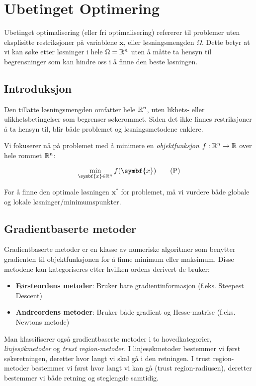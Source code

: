 \part{Ubetinget Optimering}
\label{part:unconstrained_optimization}

Ubetinget optimalisering (eller fri optimalisering) refererer til problemer uten eksplisitte restriksjoner på variablene \(\symbf{x}\), eller løsningsmengden \(\Omega\).
Dette betyr at vi kan søke etter løsninger i hele \(\Omega = \mathbb{R}^n\) uten å måtte ta hensyn til begrensninger som kan hindre oss i å finne den beste løsningen.

\chapter*{Introduksjon}
Den tillatte løsningsmengden omfatter hele \(\mathbb{R}^n\), uten likhets- eller ulikhetsbetingelser som begrenser søkerommet.
Siden det ikke finnes restriksjoner å ta hensyn til, blir både problemet og løsningsmetodene enklere.

Vi fokuserer nå på problemet med å minimere en \textit{objektfunksjon} \( f : \mathbb{R}^n \to \mathbb{R} \) over hele rommet \(\mathbb{R}^n\):

\[
	\min_{\symbf{x} \in \R^n} f(\symbf{x}) \tag{P} \label{eq:global_minimization_problem}
\]

For å finne den optimale løsningen \(\symbf{x}^\ast\) for problemet, må vi vurdere både globale og lokale løsninger/minimumspunkter.

\chapter{Gradientbaserte metoder}
\label{chap:gradient_based_methods}
Gradientbaserte metoder er en klasse av numeriske algoritmer som benytter gradienten til objektfunksjonen for å finne minimum eller maksimum.
Disse metodene kan kategoriseres etter hvilken ordens derivert de bruker:

\begin{itemize}
	\item \textbf{Førsteordens metoder}: Bruker bare gradientinformasjon (f.eks. Steepest Descent)
	\item \textbf{Andreordens metoder}: Bruker både gradient og Hesse-matrise (f.eks. Newtons metode)
\end{itemize}

Man klassifiserer også gradientbaserte metoder i to hovedkategorier, \emph{linjesøkmetoder} og \emph{trust region-metoder}. 
I linjesøkmetoder bestemmer vi først søkeretningen, deretter hvor langt vi skal gå i den retningen.
I trust region-metoder bestemmer vi først hvor langt vi kan gå (trust region-radiusen), deretter bestemmer vi både retning og steglengde samtidig.

